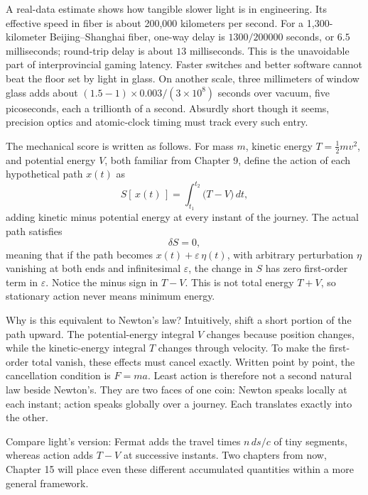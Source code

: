 A real-data estimate shows how tangible slower light is in engineering. Its effective speed in fiber is about 200,000 kilometers per second. For a 1,300-kilometer Beijing--Shanghai fiber, one-way delay is \(1300/200000\) seconds, or \(6.5\) milliseconds; round-trip delay is about \(13\) milliseconds. This is the unavoidable part of interprovincial gaming latency. Faster switches and better software cannot beat the floor set by light in glass. On another scale, three millimeters of window glass adds about \((1.5-1)\times 0.003/(3\times10^{8})\) seconds over vacuum, five picoseconds, each a trillionth of a second. Absurdly short though it seems, precision optics and atomic-clock timing must track every such entry.

\begin{mathbridge}
The mechanical score is written as follows. For mass \(m\), kinetic energy \(T=\frac12 mv^2\), and potential energy \(V\), both familiar from Chapter 9, define the action of each hypothetical path \(x(t)\) as
\[
  S[\,x(t)\,]=\int_{t_1}^{t_2}\bigl(T-V\bigr)\,dt,
\]
adding kinetic minus potential energy at every instant of the journey. The actual path satisfies
\[
  \delta S=0,
\]
meaning that if the path becomes \(x(t)+\varepsilon\,\eta(t)\), with arbitrary perturbation \(\eta\) vanishing at both ends and infinitesimal \(\varepsilon\), the change in \(S\) has zero first-order term in \(\varepsilon\). Notice the minus sign in \(T-V\). This is not total energy \(T+V\), so stationary action never means minimum energy.

Why is this equivalent to Newton's law? Intuitively, shift a short portion of the path upward. The potential-energy integral \(V\) changes because position changes, while the kinetic-energy integral \(T\) changes through velocity. To make the first-order total vanish, these effects must cancel exactly. Written point by point, the cancellation condition is \(F=ma\). Least action is therefore not a second natural law beside Newton's. They are two faces of one coin: Newton speaks locally at each instant; action speaks globally over a journey. Each translates exactly into the other.

Compare light's version: Fermat adds the travel times \(n\,ds/c\) of tiny segments, whereas action adds \(T-V\) at successive instants. Two chapters from now, Chapter 15 will place even these different accumulated quantities within a more general framework.
\end{mathbridge}


